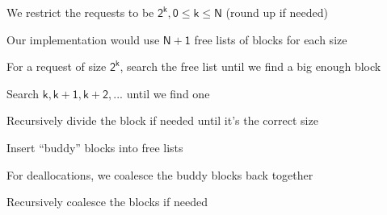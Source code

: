   \begin{slide}


    We restrict the requests to be $\mathsf{2^k, 0 \leq k \leq N}$ (round up if
    needed)
    \medskip

    Our implementation would use $\mathsf{N+1}$ free lists of blocks for each
    size
    \medskip

    For a request of size $\mathsf{2^k}$, search the free list until we find
    a big enough block

    \leftspace{}Search $\mathsf{k, k+1, k+2, ...}$ until we find one

    \leftspace{}\leftspace{}Recursively divide the block if needed until it's
    the correct size

    \leftspace{}\leftspace{}Insert “buddy” blocks into free lists
    \medskip

    For deallocations, we coalesce the buddy blocks back together

    \leftspace{}Recursively coalesce the blocks if needed

  \end{slide}

